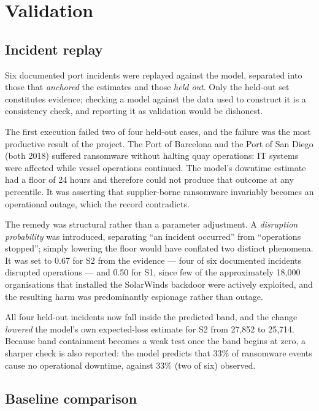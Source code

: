 \documentclass[conference]{IEEEtran}
\newcommand{\eur}{\mbox{\texteuro}}
\begin{document}
\section{Validation}
\label{sec:validation}

\subsection{Incident replay}

Six documented port incidents were replayed against the model, separated into those
that \emph{anchored} the estimates and those \emph{held out}. Only the held-out set
constitutes evidence; checking a model against the data used to construct it is a
consistency check, and reporting it as validation would be dishonest.

The first execution failed two of four held-out cases, and the failure was the most
productive result of the project. The Port of Barcelona and the Port of San Diego
(both 2018) suffered ransomware without halting quay operations: IT systems were
affected while vessel operations continued. The model's downtime estimate had a
floor of 24 hours and therefore could not produce that outcome at any percentile.
It was asserting that supplier-borne ransomware invariably becomes an operational
outage, which the record contradicts.

The remedy was structural rather than a parameter adjustment. A
\emph{disruption probability} was introduced, separating ``an incident occurred''
from ``operations stopped''; simply lowering the floor would have conflated two
distinct phenomena. It was set to 0.67 for S2 from the evidence --- four of six
documented incidents disrupted operations --- and 0.50 for S1, since few of the
approximately 18{,}000 organisations that installed the SolarWinds backdoor were
actively exploited, and the resulting harm was predominantly espionage rather than
outage.

All four held-out incidents now fall inside the predicted band, and the change
\emph{lowered} the model's own expected-loss estimate for S2 from \eur{}27{,}852 to
\eur{}25{,}714. Because band containment becomes a weak test once the band begins at
zero, a sharper check is also reported: the model predicts that 33\% of ransomware
events cause no operational downtime, against 33\% (two of six) observed.

\subsection{Baseline comparison}
\end{document}
